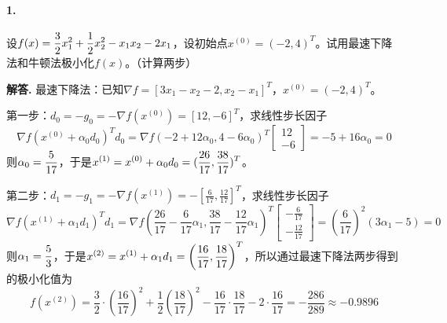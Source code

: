 \documentclass[12pt, a4paper, oneside]{ctexart}
\newenvironment{solution}{\par\noindent\textbf{解答. }}{\bigskip\par}
\begin{document}
\paragraph*{1.}设$\displaystyle f(x) = \frac{3}{2}x_1^2+\frac{1}{2}x_2^2-x_1x_2-2x_1$，设初始点$x^{(0)} = (-2, 4)^T$。试用最速下降法和牛顿法极小化$f(x)$。（计算两步）
\begin{solution}
    最速下降法：已知$\nabla f = [3x_1-x_2-2,x_2-x_1]^T$，$x^{(0)} = (-2, 4)^T$。
    
    第一步：$d_0 = -g_0 = -\nabla f(x^{(0)}) = [12, -6]^T$，求线性步长因子
    \begin{equation*}
        \nabla f(x^{(0)} + \alpha_0d_0)^Td_0 = \nabla f(-2+12\alpha_0, 4-6\alpha_0)^T\left[\begin{matrix}
            12\\-6
        \end{matrix}\right] = -5+16\alpha_0 = 0
    \end{equation*}
    则$\displaystyle \alpha_0 = \frac{5}{17}$，于是$\displaystyle x^{(1)} = x^{(0)} + \alpha_0d_0 = (\frac{26}{17},\frac{38}{17})^T$。

    第二步：$ d_1 = -g_1 = -\nabla f(x^{(1)}) = -\left[\frac{6}{17}, \frac{12}{17}\right]^T$，求线性步长因子
    \begin{equation*}
        \nabla f(x^{(1)}+\alpha_1d_1)^Td_1 = \nabla f\left(\frac{26}{17}-\frac{6}{17}\alpha_1,\frac{38}{17}-\frac{12}{17}\alpha_1\right)^T\left[\begin{matrix}
            -\frac{6}{17}\\-\frac{12}{17}
        \end{matrix}\right] = \left(\frac{6}{17}\right)^2(3\alpha_1-5) = 0
    \end{equation*}
    则$\displaystyle \alpha_1 = \frac{5}{3}$，于是$\displaystyle x^{(2)} = x^{(1)} + \alpha_1d_1 = \left(\frac{16}{17},\frac{18}{17}\right)^T$，所以通过最速下降法两步得到的极小化值为
    \begin{equation*}
        f(x^{(2)}) = \frac{3}{2}\cdot \left(\frac{16}{17}\right)^2+\frac{1}{2}\left(\frac{18}{17}\right)^2-\frac{16}{17}\cdot \frac{18}{17}-2\cdot \frac{16}{17} = -\frac{286}{289} \approx -0.9896
    \end{equation*}


\end{solution}
\end{document}
